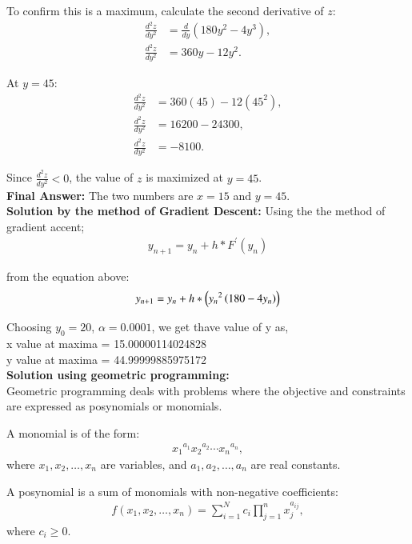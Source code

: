 \documentclass[journal,12pt,onecolumn]{IEEEtran}
\theoremstyle{remark}
\begin{document}
To confirm this is a maximum, calculate the second derivative of $z$:  
\begin{align}
    \frac{d^2z}{dy^2} &= \frac{d}{dy}(180y^2 - 4y^3), \\
    \frac{d^2z}{dy^2} &= 360y - 12y^2.
\end{align}

At $y = 45$:  
\begin{align}
    \frac{d^2z}{dy^2} &= 360(45) - 12(45^2), \\
    \frac{d^2z}{dy^2} &= 16200 - 24300, \\
    \frac{d^2z}{dy^2} &= -8100.
\end{align}

Since $\frac{d^2z}{dy^2} < 0$, the value of $z$ is maximized at $y = 45$. \\

\textbf{Final Answer:} The two numbers are $x = 15$ and $y = 45$.\\


\textbf{Solution by the method of Gradient Descent:}
Using the the method of gradient accent;
\begin{align}
	y_{n+1}=y_n+h*F^{'}(y_n)
\end{align}

from the equation above:
\begin{align}
	y_{n+1}=y_n+h*\left({y_n}^2\left(180-4y_n\right)\right)
\end{align}
 
Choosing $y_0=20$, $\alpha=0.0001$, we get thave value of y as,\\
x value at maxima =  15.00000114024828\\
y value at maxima =  44.99999885975172\\


 \textbf{Solution using geometric programming:}\\
Geometric programming deals with problems where the objective and constraints are expressed as posynomials or monomials. 

A monomial is of the form:
\begin{align}
    {x_1}^{a_1}{x_2}^{a_2}\cdots{x_n}^{a_n},
\end{align}
where $x_1, x_2, \dots, x_n$ are variables, and $a_1, a_2, \dots, a_n$ are real constants.

A posynomial is a sum of monomials with non-negative coefficients:
\begin{align}
    f(x_1, x_2, \dots, x_n) = \sum_{i=1}^N c_i \prod_{j=1}^n x_j^{a_{ij}},
\end{align}
where $c_i \geq 0$.
\end{document}
